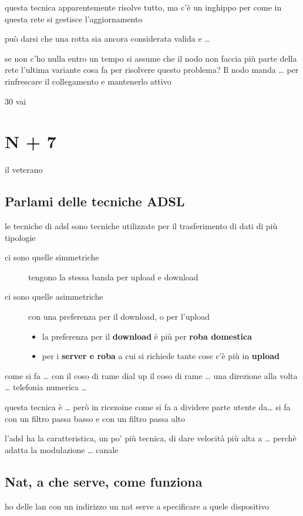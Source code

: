 \documentclass[11pt]{article}
\begin{document}
questa tecnica apparentemente risolve tutto, ma c'è un inghippo per come in questa rete si gestisce l'aggiornamento

può darsi che una rotta sia ancora considerata valida e \ldots{}

se non c'ho nulla entro un tempo si assume che il nodo non faccia più parte della rete
l'ultima variante cosa fa per risolvere questo problema? Il nodo manda \ldots{} per rinfrescare il collegamento e mantenerlo attivo

30 vai

\section{N + 7}
\label{sec:org35104f8}
il veterano
\subsection{Parlami delle tecniche ADSL}
\label{sec:org2cd93e0}
le tecniche di adsl sono tecniche utilizzate per il trasferimento di dati di più tipologie
\begin{description}
\item[{ci sono quelle simmetriche}] tengono la stessa banda per upload e download
\item[{ci sono quelle asimmetriche}] con una preferenza per il download, o per l'upload
\begin{itemize}
\item la preferenza per il \textbf{download} è più per \textbf{roba domestica}
\item per i \textbf{server e roba} a cui si richiede tante cose c'è più in \textbf{upload}
\end{itemize}
\end{description}

come si fa \ldots{} con il coso di rame dial up
il coso di rame \ldots{} una direzione alla volta
\ldots{} telefonia numerica \ldots{}

questa tecnica è \ldots{}
però in ricezoine come si fa a dividere parte utente da\ldots{}
si fa con un filtro passa basso e con un filtro passa alto

l'adsl ha la caratteristica, un po' più tecnica, di dare velocità più alta a \ldots{} perchè adatta la modulazione \ldots{} canale

\subsection{Nat, a che serve, come funziona}
\label{sec:orgef80a22}
ho delle lan con un indirizzo
un nat serve a specificare a quele dispositivo
\end{document}
